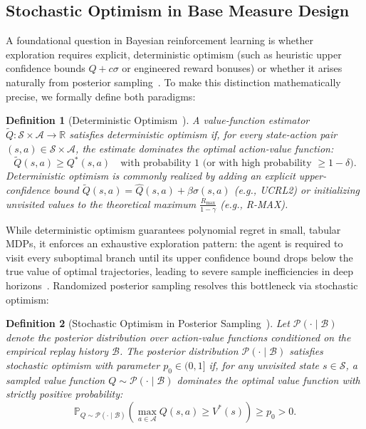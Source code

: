 \documentclass[10pt]{article}
\newtheorem{defn}{Definition}
\begin{document}
\subsection{Stochastic Optimism in Base Measure Design}
\label{sec:stochastic-optimism-base-measure}

A foundational question in Bayesian reinforcement learning is whether exploration requires explicit, deterministic optimism (such as heuristic upper confidence bounds $Q + c\sigma$ or engineered reward bonuses) or whether it arises naturally from posterior sampling~\citep{osband2013more, osband2017posterior}. To make this distinction mathematically precise, we formally define both paradigms:

\begin{defn}[Deterministic Optimism~\citep{brafman2002r, auer2008near}]
\label{def:deterministic-optimism}
A value-function estimator $\widetilde{Q}: \mathcal{S} \times \mathcal{A} \to \mathbb{R}$ satisfies \emph{deterministic optimism} if, for every state-action pair $(s, a) \in \mathcal{S} \times \mathcal{A}$, the estimate dominates the optimal action-value function:
\begin{equation}
\widetilde{Q}(s, a) \ge Q^*(s, a) \quad \text{with probability } 1 \text{ (or with high probability } \ge 1 - \delta\text{)}.
\end{equation}
Deterministic optimism is commonly realized by adding an explicit upper-confidence bound $\widetilde{Q}(s, a) = \widehat{Q}(s, a) + \beta \sigma(s, a)$ (e.g., UCRL2) or initializing unvisited values to the theoretical maximum $\frac{R_{\max}}{1 - \gamma}$ (e.g., R-MAX).
\end{defn}

While deterministic optimism guarantees polynomial regret in small, tabular MDPs, it enforces an exhaustive exploration pattern: the agent is required to visit every suboptimal branch until its upper confidence bound drops below the true value of optimal trajectories, leading to severe sample inefficiencies in deep horizons~\citep{osband2017posterior}. Randomized posterior sampling resolves this bottleneck via stochastic optimism:

\begin{defn}[Stochastic Optimism in Posterior Sampling~\citep{osband2013more, osband2017posterior}]
\label{def:stochastic-optimism}
Let $\mathcal{P}(\cdot \mid \mathcal{B})$ denote the posterior distribution over action-value functions conditioned on the empirical replay history $\mathcal{B}$. The posterior distribution $\mathcal{P}(\cdot \mid \mathcal{B})$ satisfies \emph{stochastic optimism} with parameter $p_0 \in (0, 1]$ if, for any unvisited state $s \in \mathcal{S}$, a sampled value function $Q \sim \mathcal{P}(\cdot \mid \mathcal{B})$ dominates the optimal value function with strictly positive probability:
\begin{equation}
\mathbb{P}_{Q \sim \mathcal{P}(\cdot \mid \mathcal{B})}\left( \max_{a \in \mathcal{A}} Q(s, a) \ge V^*(s) \right) \ge p_0 > 0.
\end{equation}
\end{defn}
\end{document}
